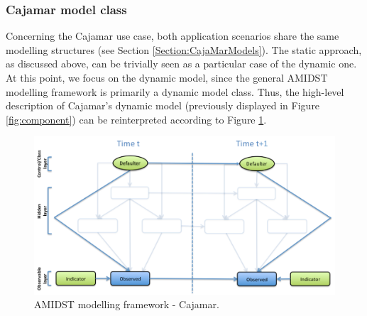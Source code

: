 \subsubsection{Cajamar model class}\label{cajamarAMIDSTModels}

Concerning the Cajamar use case, both application scenarios share the same modelling structures (see Section \ref{Section:CajaMarModels}). The static approach, as discussed above, can be trivially seen as a particular case of the dynamic one. At this point, we focus on the dynamic model, since the general AMIDST modelling framework is primarily a dynamic model class. Thus, the high-level description of Cajamar's dynamic model (previously displayed in Figure \ref{fig:component}) can be reinterpreted according  to Figure \ref{Figure:AMIDSTModelClassCajamar}. 

\begin{figure}[ht!]
\begin{center}
\includegraphics[scale=0.39]{./figures/AMIDSTModelClassCajamar.png}
\caption{\label{Figure:AMIDSTModelClassCajamar} AMIDST modelling framework - Cajamar.}
\end{center}
\end{figure}


